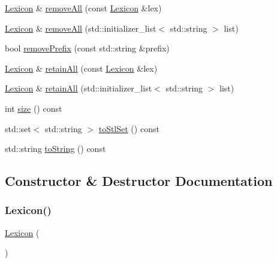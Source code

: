 \begin{DoxyCompactItemize}
\item 
\mbox{\hyperlink{classLexicon}{Lexicon}} \& \mbox{\hyperlink{classLexicon_a606a7338945745d8ac9ce21f456f08d9}{remove\+All}} (const \mbox{\hyperlink{classLexicon}{Lexicon}} \&lex)
\item 
\mbox{\hyperlink{classLexicon}{Lexicon}} \& \mbox{\hyperlink{classLexicon_a8ef0b8a849b2d33d83bc9689c4c4d090}{remove\+All}} (std\+::initializer\+\_\+list$<$ std\+::string $>$ list)
\item 
bool \mbox{\hyperlink{classLexicon_a998af18a2f0af7d18ce689acee75ca59}{remove\+Prefix}} (const std\+::string \&prefix)
\item 
\mbox{\hyperlink{classLexicon}{Lexicon}} \& \mbox{\hyperlink{classLexicon_a38501eec95ff302cb83dae17ab478b81}{retain\+All}} (const \mbox{\hyperlink{classLexicon}{Lexicon}} \&lex)
\item 
\mbox{\hyperlink{classLexicon}{Lexicon}} \& \mbox{\hyperlink{classLexicon_a17b175aadba16c14093da01963914b33}{retain\+All}} (std\+::initializer\+\_\+list$<$ std\+::string $>$ list)
\item 
int \mbox{\hyperlink{classLexicon_af9593d4a5ff4274efaf429cb4f9e57cc}{size}} () const
\item 
std\+::set$<$ std\+::string $>$ \mbox{\hyperlink{classLexicon_a56b9ca7800c467295cab333fd9815291}{to\+Stl\+Set}} () const
\item 
std\+::string \mbox{\hyperlink{classLexicon_a1fe5121d6528fdea3f243321b3fa3a49}{to\+String}} () const
\end{DoxyCompactItemize}


\subsection{Constructor \& Destructor Documentation}
\mbox{\label{classLexicon_ac38cafae91a89528e71f257cbad724fd}} 
\subsubsection{\texorpdfstring{Lexicon()}{Lexicon()}\hspace{0.1cm}{\footnotesize\ttfamily [1/5]}}
{\footnotesize\ttfamily \mbox{\hyperlink{classLexicon}{Lexicon}} (\begin{DoxyParamCaption}{ }\end{DoxyParamCaption})}

\mbox{\label{classLexicon_a6e60e4bcfef0337c5133d3bedcccd06f}} 
